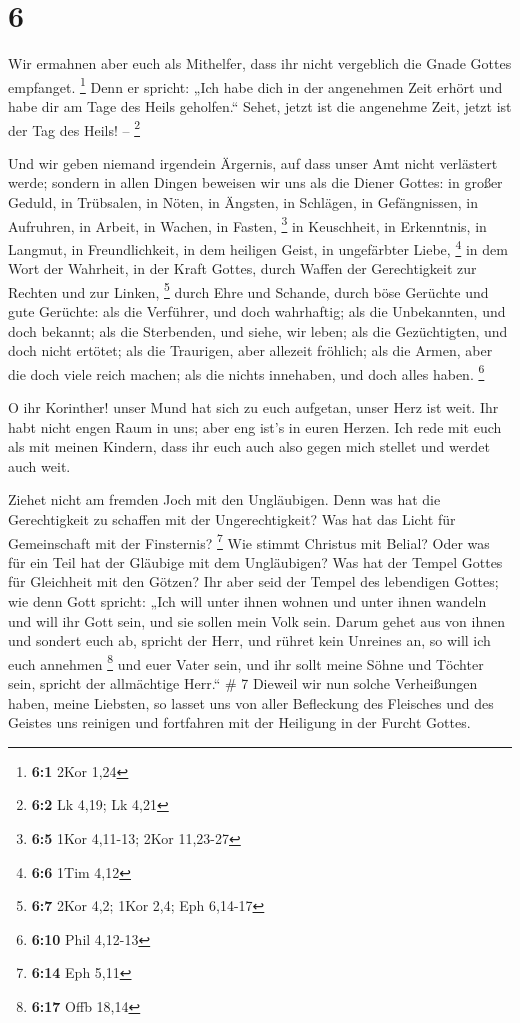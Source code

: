 \hypertarget{section-3}{%
\section{6}\label{section-3}}

 Wir ermahnen aber euch als Mithelfer, dass ihr nicht
vergeblich die Gnade Gottes empfanget. \footnote{\textbf{6:1} 2Kor 1,24}
 Denn er spricht: „Ich habe dich in der angenehmen Zeit
erhört und habe dir am Tage des Heils geholfen.`` Sehet, jetzt ist die
angenehme Zeit, jetzt ist der Tag des Heils! -- \footnote{\textbf{6:2}
  Lk 4,19; Lk 4,21}

 Und wir geben niemand irgendein Ärgernis, auf dass unser
Amt nicht verlästert werde;  sondern in allen Dingen
beweisen wir uns als die Diener Gottes: in großer Geduld, in Trübsalen,
in Nöten, in Ängsten,  in Schlägen, in Gefängnissen, in
Aufruhren, in Arbeit, in Wachen, in Fasten, \footnote{\textbf{6:5} 1Kor
  4,11-13; 2Kor 11,23-27}  in Keuschheit, in Erkenntnis,
in Langmut, in Freundlichkeit, in dem heiligen Geist, in ungefärbter
Liebe, \footnote{\textbf{6:6} 1Tim 4,12}  in dem Wort der
Wahrheit, in der Kraft Gottes, durch Waffen der Gerechtigkeit zur
Rechten und zur Linken, \footnote{\textbf{6:7} 2Kor 4,2; 1Kor 2,4; Eph
  6,14-17}  durch Ehre und Schande, durch böse Gerüchte
und gute Gerüchte: als die Verführer, und doch wahrhaftig;
 als die Unbekannten, und doch bekannt; als die
Sterbenden, und siehe, wir leben; als die Gezüchtigten, und doch nicht
ertötet;  als die Traurigen, aber allezeit fröhlich; als
die Armen, aber die doch viele reich machen; als die nichts innehaben,
und doch alles haben. \footnote{\textbf{6:10} Phil 4,12-13}

 O ihr Korinther! unser Mund hat sich zu euch aufgetan,
unser Herz ist weit.  Ihr habt nicht engen Raum in uns;
aber eng ist's in euren Herzen.  Ich rede mit euch als
mit meinen Kindern, dass ihr euch auch also gegen mich stellet und
werdet auch weit.

 Ziehet nicht am fremden Joch mit den Ungläubigen. Denn
was hat die Gerechtigkeit zu schaffen mit der Ungerechtigkeit? Was hat
das Licht für Gemeinschaft mit der Finsternis? \footnote{\textbf{6:14}
  Eph 5,11}  Wie stimmt Christus mit Belial? Oder was für
ein Teil hat der Gläubige mit dem Ungläubigen?  Was hat
der Tempel Gottes für Gleichheit mit den Götzen? Ihr aber seid der
Tempel des lebendigen Gottes; wie denn Gott spricht: „Ich will unter
ihnen wohnen und unter ihnen wandeln und will ihr Gott sein, und sie
sollen mein Volk sein.  Darum gehet aus von ihnen und
sondert euch ab, spricht der Herr, und rühret kein Unreines an, so will
ich euch annehmen \footnote{\textbf{6:17} Offb 18,14} 
und euer Vater sein, und ihr sollt meine Söhne und Töchter sein, spricht
der allmächtige Herr.`` \# 7  Dieweil wir nun solche
Verheißungen haben, meine Liebsten, so lasset uns von aller Befleckung
des Fleisches und des Geistes uns reinigen und fortfahren mit der
Heiligung in der Furcht Gottes.

